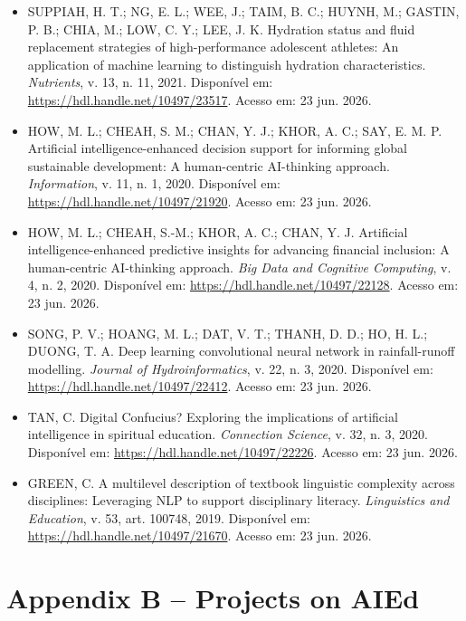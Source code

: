 \documentclass[english]{textolivre}
\begin{document}
\begin{itemize}
\item[] SUPPIAH, H. T.; NG, E. L.; WEE, J.; TAIM, B. C.; HUYNH, M.; GASTIN, P. B.; CHIA, M.; LOW, C. Y.; LEE, J. K. Hydration status and fluid replacement strategies of high-performance adolescent athletes: An application of machine learning to distinguish hydration characteristics. \textit{Nutrients}, v. 13, n. 11, 2021. Disponível em: \url{https://hdl.handle.net/10497/23517}. Acesso em: 23 jun. 2026.

\item[] HOW, M. L.; CHEAH, S. M.; CHAN, Y. J.; KHOR, A. C.; SAY, E. M. P. Artificial intelligence-enhanced decision support for informing global sustainable development: A human-centric AI-thinking approach. \textit{Information}, v. 11, n. 1, 2020. Disponível em: \url{https://hdl.handle.net/10497/21920}. Acesso em: 23 jun. 2026.

\item[] HOW, M. L.; CHEAH, S.-M.; KHOR, A. C.; CHAN, Y. J. Artificial intelligence-enhanced predictive insights for advancing financial inclusion: A human-centric AI-thinking approach. \textit{Big Data and Cognitive Computing}, v. 4, n. 2, 2020. Disponível em: \url{https://hdl.handle.net/10497/22128}. Acesso em: 23 jun. 2026.

\item[] SONG, P. V.; HOANG, M. L.; DAT, V. T.; THANH, D. D.; HO, H. L.; DUONG, T. A. Deep learning convolutional neural network in rainfall-runoff modelling. \textit{Journal of Hydroinformatics}, v. 22, n. 3, 2020. Disponível em: \url{https://hdl.handle.net/10497/22412}. Acesso em: 23 jun. 2026.

\item[] TAN, C. Digital Confucius? Exploring the implications of artificial intelligence in spiritual education. \textit{Connection Science}, v. 32, n. 3, 2020. Disponível em: \url{https://hdl.handle.net/10497/22226}. Acesso em: 23 jun. 2026.

\item[] GREEN, C. A multilevel description of textbook linguistic complexity across disciplines: Leveraging NLP to support disciplinary literacy. \textit{Linguistics and Education}, v. 53, art. 100748, 2019. Disponível em: \url{https://hdl.handle.net/10497/21670}. Acesso em: 23 jun. 2026.

\end{itemize}

\section{Appendix B – Projects on AIEd}\label{apx-longtable2}
\end{document}
